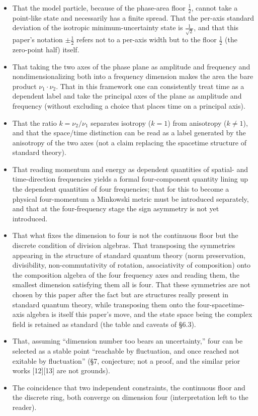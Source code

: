 \documentclass[
]{article}
\providecommand{\tightlist}{%
  \setlength{\itemsep}{0pt}\setlength{\parskip}{0pt}}
\begin{document}
\begin{itemize}
\tightlist
\item
  That the model particle, because of the phase-area floor \(\tfrac12\),
  cannot take a point-like state and necessarily has a finite spread.
  That the per-axis standard deviation of the isotropic
  minimum-uncertainty state is \(\tfrac{1}{\sqrt2}\), and that this
  paper's notation \(\pm\tfrac12\) refers not to a per-axis width but to
  the floor \(\tfrac12\) (the zero-point half) itself.
\item
  That taking the two axes of the phase plane as amplitude and frequency
  and nondimensionalizing both into a frequency dimension makes the area
  the bare product \(\nu_1\cdot\nu_2\). That in this framework one can
  consistently treat time as a dependent label and take the principal
  axes of the plane as amplitude and frequency (without excluding a
  choice that places time on a principal axis).
\item
  That the ratio \(k=\nu_2/\nu_1\) separates isotropy (\(k=1\)) from
  anisotropy (\(k\neq1\)), and that the space/time distinction can be
  read as a label generated by the anisotropy of the two axes (not a
  claim replacing the spacetime structure of standard theory).
\item
  That reading momentum and energy as dependent quantities of spatial-
  and time-direction frequencies yields a formal four-component quantity
  lining up the dependent quantities of four frequencies; that for this
  to become a physical four-momentum a Minkowski metric must be
  introduced separately, and that at the four-frequency stage the sign
  asymmetry is not yet introduced.
\item
  That what fixes the dimension to four is not the continuous floor but
  the discrete condition of division algebras. That transposing the
  symmetries appearing in the structure of standard quantum theory (norm
  preservation, divisibility, non-commutativity of rotation,
  associativity of composition) onto the composition algebra of the four
  frequency axes and reading them, the smallest dimension satisfying
  them all is four. That these symmetries are not chosen by this paper
  after the fact but are structures really present in standard quantum
  theory, while transposing them onto the four-spacetime-axis algebra is
  itself this paper's move, and the state space being the complex field
  is retained as standard (the table and caveats of §6.3).
\item
  That, assuming ``dimension number too bears an uncertainty,'' four can
  be selected as a stable point ``reachable by fluctuation, and once
  reached not exitable by fluctuation'' (§7, conjecture; not a proof,
  and the similar prior works {[}12{]}{[}13{]} are not grounds).
\item
  The coincidence that two independent constraints, the continuous floor
  and the discrete ring, both converge on dimension four (interpretation
  left to the reader).
\end{itemize}
\end{document}

